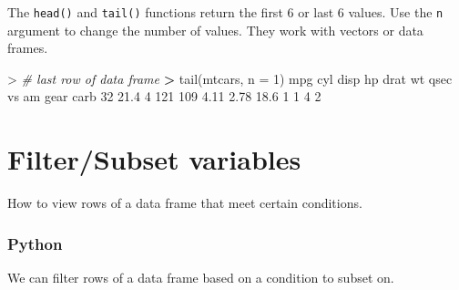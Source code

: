 \documentclass[
]{book}
\newenvironment{Shaded}{\begin{snugshade}}{\end{snugshade}}
\newcommand{\AttributeTok}[1]{\textcolor[rgb]{0.77,0.63,0.00}{#1}}
\newcommand{\CommentTok}[1]{\textcolor[rgb]{0.56,0.35,0.01}{\textit{#1}}}
\newcommand{\DecValTok}[1]{\textcolor[rgb]{0.00,0.00,0.81}{#1}}
\newcommand{\ErrorTok}[1]{\textcolor[rgb]{0.64,0.00,0.00}{\textbf{#1}}}
\newcommand{\FloatTok}[1]{\textcolor[rgb]{0.00,0.00,0.81}{#1}}
\newcommand{\FunctionTok}[1]{\textcolor[rgb]{0.00,0.00,0.00}{#1}}
\newcommand{\NormalTok}[1]{#1}
\newcommand{\SpecialCharTok}[1]{\textcolor[rgb]{0.00,0.00,0.00}{#1}}
\begin{document}
The \texttt{head()} and \texttt{tail()} functions return the first 6 or last 6 values. Use the \texttt{n} argument to change the number of values. They work with vectors or data frames.

\begin{Shaded}
\end{Shaded}

\begin{Shaded}
\begin{Highlighting}[]
\SpecialCharTok{\textgreater{}} \CommentTok{\# last row of data frame}
\ErrorTok{\textgreater{}} \FunctionTok{tail}\NormalTok{(mtcars, }\AttributeTok{n =} \DecValTok{1}\NormalTok{)}
\NormalTok{    mpg cyl disp  hp drat   wt qsec vs am gear carb}
\DecValTok{32} \FloatTok{21.4}   \DecValTok{4}  \DecValTok{121} \DecValTok{109} \FloatTok{4.11} \FloatTok{2.78} \FloatTok{18.6}  \DecValTok{1}  \DecValTok{1}    \DecValTok{4}    \DecValTok{2}
\end{Highlighting}
\end{Shaded}

\hypertarget{filtersubset-variables}{%
\section{Filter/Subset variables}\label{filtersubset-variables}}

How to view rows of a data frame that meet certain conditions.

\hypertarget{python-19}{%
\subsubsection*{Python}\label{python-19}}

We can filter rows of a data frame based on a condition to subset on.
\end{document}
